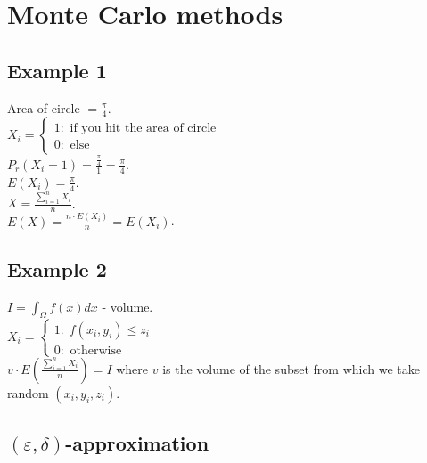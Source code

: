\documentclass[a4paper, 12pt]{book}
\theoremstyle{definition}
\theoremstyle{remark}
\begin{document}
\chapter{Monte Carlo methods}


\section{Example 1}

Area of circle $= \frac{\pi}{4}$. \\
$X_i = \begin{cases}
  1: \text{ if you hit the area of circle} \\
  0: \text{ else}
\end{cases}$ \\
$P_r(X_i = 1) = \frac{\frac{\pi}{4}}{1} = \frac{\pi}{4}$. \\
$E(X_i) = \frac{\pi}{4}$. \\
$X = \frac{\sum_{i=1}^{n} X_i}{n}$. \\
$E(X) = \frac{n \cdot E(X_i)}{n} = E(X_i)$.



\section{Example 2}

$I = \int_{\Omega} f(x) dx$ - volume. \\
$X_i = \begin{cases}
  1: \; f(x_i,y_i) \leq z_i \\
  0: \text{ otherwise}
\end{cases}$ \\
$v \cdot E\left(\frac{\sum_{i=1}^{n} X_i}{n}\right) = I$ where $v$ is the volume of the subset from which we take random $(x_i, y_i, z_i)$.


\section{$(\varepsilon,\delta)$-approximation}
\end{document}
